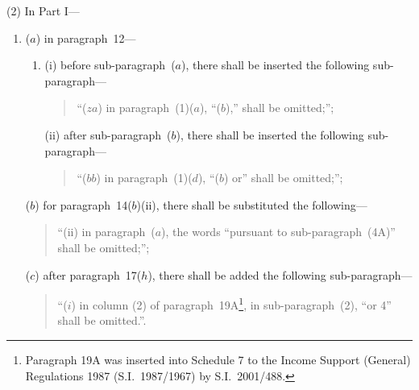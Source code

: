 \documentclass[12pt,a4paper]{article}
\begin{document}
(2) In Part I—
\begin{enumerate}\item[]
($a$) in paragraph~12—
\begin{enumerate}\item[]
(i) before sub-paragraph~($a$), there shall be inserted the following sub-paragraph—
\begin{quotation}
“($za$) in paragraph~(1)($a$), “($b$),” shall be omitted;”;
\end{quotation}

(ii) after sub-paragraph~($b$), there shall be inserted the following sub-paragraph—
\begin{quotation}
“($bb$) in paragraph~(1)($d$), “($b$)  or” shall be omitted;”;
\end{quotation}
\end{enumerate}

($b$) for paragraph~14($b$)(ii), there shall be substituted the following—
\begin{quotation}
“(ii) in paragraph~($a$), the words “pursuant to sub-\hspace{0pt}paragraph~(4A)” shall be omitted;”;
\end{quotation}

($c$) after paragraph~17($h$), there shall be added the following sub-paragraph—
\begin{quotation}
“($i$) in column (2) of paragraph~19A\footnote{Paragraph 19A was inserted into Schedule 7 to the Income Support (General) Regulations 1987 (S.I.~1987/1967) by S.I.~2001/488.}, in sub-paragraph~(2), “or 4” shall be omitted.”.
\end{quotation}
\end{enumerate}
\end{document}
